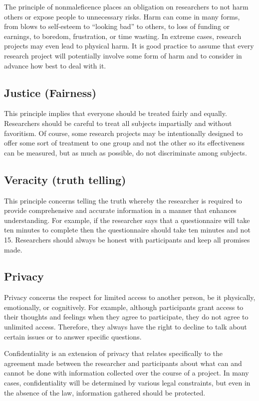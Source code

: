 The principle of nonmaleficence places an obligation on researchers to not harm others or expose people to unnecessary risks. Harm can come in many forms, from blows to self-esteem to ``looking bad'' to others, to loss of funding or earnings, to boredom, frustration, or time wasting. In extreme cases, research projects may even lead to physical harm. It is good practice to assume that every research project will potentially involve some form of harm and to consider in advance how best to deal with it.

\subsection{Justice (Fairness)}

This principle implies that everyone should be treated fairly and equally. Researchers should be careful to treat all subjects impartially and without favoritism. Of course, some research projects may be intentionally designed to offer some sort of treatment to one group and not the other so its effectiveness can be measured, but as much as possible, do not discriminate among subjects.

\subsection{Veracity (truth telling)}

This principle concerns telling the truth whereby the researcher is required to provide comprehensive and accurate information in a manner that enhances understanding. For example, if the researcher says that a questionnaire will take ten minutes to complete then the questionnaire should take ten minutes and not 15. Researchers should always be honest with participants and keep all promises made.

\subsection{Privacy}

Privacy concerns the respect for limited access to another person, be it physically, emotionally, or cognitively. For example, although participants grant access to their thoughts and feelings when they agree to participate, they do not agree to unlimited access. Therefore, they always have the right to decline to talk about certain issues or to answer specific questions.

Confidentiality is an extension of privacy that relates specifically to the agreement made between the researcher and participants about what can and cannot be done with information collected over the course of a project. In many cases, confidentiality will be determined by various legal constraints, but even in the absence of the law, information gathered should be protected.

